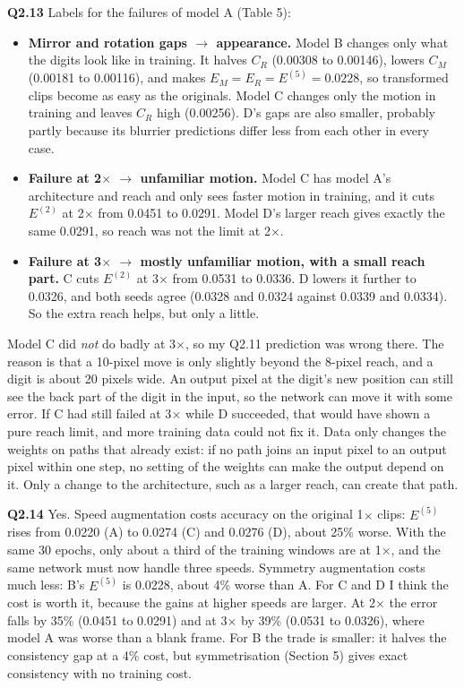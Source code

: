 \documentclass[11pt,a4paper]{article}
\begin{document}
\textbf{Q2.13} Labels for the failures of model A (Table 5):
\begin{itemize}
  \item \textbf{Mirror and rotation gaps $\rightarrow$ appearance.} Model B changes only what the digits look like in training. It halves $C_R$ (0.00308 to 0.00146), lowers $C_M$ (0.00181 to 0.00116), and makes $E_M = E_R = E^{(5)} = 0.0228$, so transformed clips become as easy as the originals. Model C changes only the motion in training and leaves $C_R$ high (0.00256). D's gaps are also smaller, probably partly because its blurrier predictions differ less from each other in every case.
  \item \textbf{Failure at 2$\times$ $\rightarrow$ unfamiliar motion.} Model C has model A's architecture and reach and only sees faster motion in training, and it cuts $E^{(2)}$ at 2$\times$ from 0.0451 to 0.0291. Model D's larger reach gives exactly the same 0.0291, so reach was not the limit at 2$\times$.
  \item \textbf{Failure at 3$\times$ $\rightarrow$ mostly unfamiliar motion, with a small reach part.} C cuts $E^{(2)}$ at 3$\times$ from 0.0531 to 0.0336. D lowers it further to 0.0326, and both seeds agree (0.0328 and 0.0324 against 0.0339 and 0.0334). So the extra reach helps, but only a little.
\end{itemize}
Model C did \emph{not} do badly at 3$\times$, so my Q2.11 prediction was wrong there. The reason is that a 10-pixel move is only slightly beyond the 8-pixel reach, and a digit is about 20 pixels wide. An output pixel at the digit's new position can still see the back part of the digit in the input, so the network can move it with some error. If C had still failed at 3$\times$ while D succeeded, that would have shown a pure reach limit, and more training data could not fix it. Data only changes the weights on paths that already exist: if no path joins an input pixel to an output pixel within one step, no setting of the weights can make the output depend on it. Only a change to the architecture, such as a larger reach, can create that path.

\textbf{Q2.14} Yes. Speed augmentation costs accuracy on the original 1$\times$ clips: $E^{(5)}$ rises from 0.0220 (A) to 0.0274 (C) and 0.0276 (D), about 25\% worse. With the same 30 epochs, only about a third of the training windows are at 1$\times$, and the same network must now handle three speeds. Symmetry augmentation costs much less: B's $E^{(5)}$ is 0.0228, about 4\% worse than A. For C and D I think the cost is worth it, because the gains at higher speeds are larger. At 2$\times$ the error falls by 35\% (0.0451 to 0.0291) and at 3$\times$ by 39\% (0.0531 to 0.0326), where model A was worse than a blank frame. For B the trade is smaller: it halves the consistency gap at a 4\% cost, but symmetrisation (Section 5) gives exact consistency with no training cost.
\end{document}
